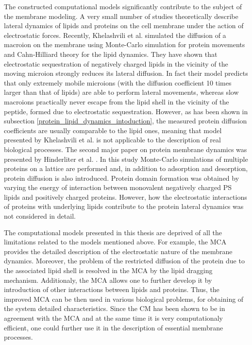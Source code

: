 The constructed computational models significantly contribute to the subject of the membrane modeling. A very small number of studies theoretically describe lateral dynamics of lipids and proteins on the cell membrane under the action of electrostatic forces. Recently, Khelashvili et al. \cite{Khelashvili2008} simulated the diffusion of a macroion on the membrane using Monte-Carlo simulation for protein movements and Cahn-Hilliard theory for the lipid dynamics. They have shown that electrostatic sequestration of negatively charged lipids in the vicinity of the moving microion strongly reduces its lateral diffusion. In fact their model predicts that only extremely mobile microions (with the diffusion coefficient 10 times larger than that of lipids) are able to perform lateral movements, whereas slow macroions practically never escape from the lipid shell in the vicinity of the peptide, formed due to electrostatic sequestration. However, as has been shown in subsection \ref{protein_lipid_dynamics_intoduction}, the measured protein diffusion coefficients are usually comparable to the lipid ones, meaning that model presented by Khelashvili et al. is not applicable to the description of real biological processes. The second major paper on protein membrane dynamics was presented by Hinderliter et al. \cite{Hinderliter2001}. In this study Monte-Carlo simulations of multiple proteins on a lattice are performed and, in addition to adsorption and desorption, protein diffusion is also introduced. Protein domain formation was obtained by varying the energy of interaction between monovalent negatively charged PS lipids and positively charged proteins. However, how the electrostatic interactions of proteins with underlying lipids contribute to the protein lateral dynamics was not considered in detail. 

The computational models presented in this thesis are deprived of all the limitations related to the models mentioned above. For example, the MCA provides the detailed description of the electrostatic nature of the membrane dynamics. Moreover, the problem of the restricted diffusion of the protein due to the associated lipid shell is resolved in the MCA by the lipid dragging mechanism. Additionaly, the MCA allows one to further develop it by introduction of other interactions between lipids and proteins. Thus, the improved MCA can be then used in various biological problems, for obtaining of the system detailed characteristics. Since the CM has been shown to be in agreement with the MCA and at the same time it is very computationaly efficient, one could further use it in the description of essential membrane processes.


